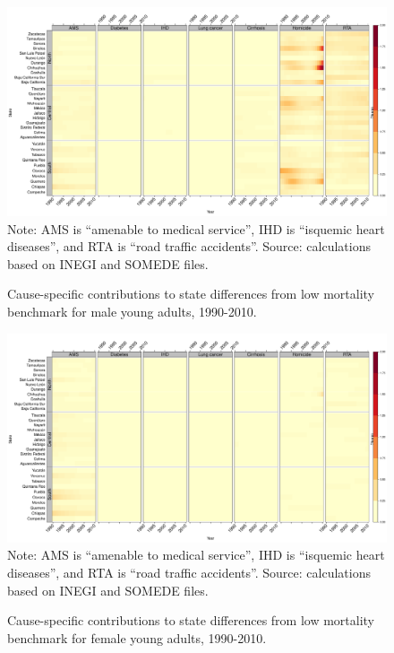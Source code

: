 \documentclass[11.5pt]{article}
\begin{document}
{\begin{figure}
\centering
\caption{Cause-specific contributions to state differences from low mortality benchmark for male young adults, 1990-2010.}
\label{fig:e15_39_males}
\includegraphics[scale=.3]{Figures/YoungAdult_Male_heatmap.pdf}
Note: AMS is ``amenable to medical service'', IHD is ``isquemic heart diseases'', and RTA is ``road traffic accidents''. Source: calculations based on INEGI and SOMEDE files.
\end{figure}

\begin{figure}
\centering
\caption{Cause-specific contributions to state differences from low mortality benchmark for female young adults, 1990-2010.}
\label{fig:e15_39_females}
\includegraphics[scale=.3]{Figures/YoungAdult_Female_heatmap.pdf}
Note: AMS is ``amenable to medical service'', IHD is ``isquemic heart diseases'', and RTA is ``road traffic accidents''. Source: calculations based on INEGI and SOMEDE files.
\end{figure}



\begin{landscape}


\end{landscape}}
\end{document}

